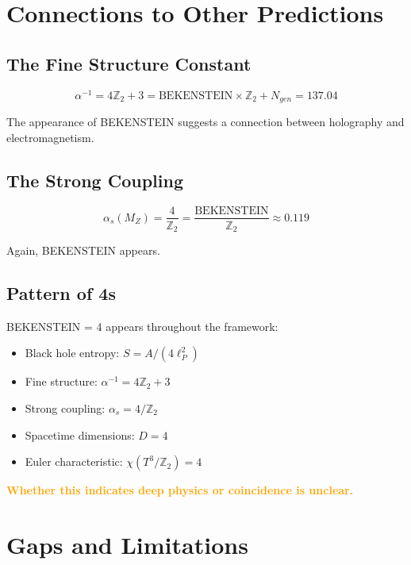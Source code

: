 \documentclass[12pt,a4paper]{article}
\begin{document}
\section{Connections to Other Predictions}

\subsection{The Fine Structure Constant}

\begin{equation}
\alpha^{-1} = 4\mathbb{Z}_2 + 3 = \text{BEKENSTEIN} \times \mathbb{Z}_2 + N_{gen} = 137.04
\end{equation}

The appearance of BEKENSTEIN suggests a connection between holography and electromagnetism.

\subsection{The Strong Coupling}

\begin{equation}
\alpha_s(M_Z) = \frac{4}{\mathbb{Z}_2} = \frac{\text{BEKENSTEIN}}{\mathbb{Z}_2} \approx 0.119
\end{equation}

Again, BEKENSTEIN appears.

\subsection{Pattern of 4s}

BEKENSTEIN = 4 appears throughout the framework:
\begin{itemize}
    \item Black hole entropy: $S = A/(4\ell_P^2)$
    \item Fine structure: $\alpha^{-1} = 4\mathbb{Z}_2 + 3$
    \item Strong coupling: $\alpha_s = 4/\mathbb{Z}_2$
    \item Spacetime dimensions: $D = 4$
    \item Euler characteristic: $\chi(T^3/\mathbb{Z}_2) = 4$
\end{itemize}

\textcolor{orange}{\textbf{Whether this indicates deep physics or coincidence is unclear.}}

\section{Gaps and Limitations}
\end{document}
